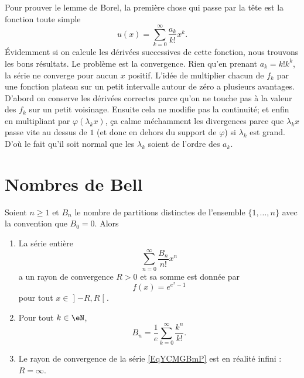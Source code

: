 \begin{remark}
	Pour prouver le lemme de Borel, la première chose qui passe par la tête est la fonction toute simple
	\begin{equation}
		u(x)=\sum_{k=0}^{\infty}\frac{ a_k }{ k! }x^k.
	\end{equation}
	Évidemment si on calcule les dérivées successives de cette fonction, nous trouvons les bons résultats. Le problème est la convergence.  Rien qu'en prenant \( a_k=k!k^k\), la série ne converge pour aucun \( x\) positif. L'idée de multiplier chacun de \( f_k\) par une fonction plateau sur un petit intervalle autour de zéro a plusieurs avantages. D'abord on conserve les dérivées correctes parce qu'on ne touche pas à la valeur des \( f_k\) sur un petit voisinage. Ensuite cela ne modifie pas la continuité; et enfin en multipliant par \( \varphi(\lambda_kx)\), ça calme méchamment les divergences parce que \( \lambda_kx\) passe vite au dessus de \( 1\) (et donc en dehors du support de \( \varphi\)) si \( \lambda_k\) est grand. D'où le fait qu'il soit normal que les \( \lambda_k\) soient de l'ordre des \( a_k\).
\end{remark}

\section{Nombres de Bell}

\begin{theorem}  \label{ThoYFAzwSg}
	Soient \( n\geq 1\) et \( B_n\) le nombre de partitions distinctes de l'ensemble \( \{ 1,\ldots, n \}\) avec la convention que \( B_0=0\). Alors
	\begin{enumerate}
		\item
		      La série entière
		      \begin{equation}    \label{EqYCMGBmP}
			      \sum_{n=0}^{\infty}\frac{ B_n }{ n! }x^n
		      \end{equation}
		      a un rayon de convergence \( R>0\) et sa somme est donnée par
		      \begin{equation}
			      f(x)= e^{ e^{x}-1}
		      \end{equation}
		      pour tout \( x\in\mathopen] -R , R \mathclose[\).
		\item
		      Pour tout \( k\in \eN\),
		      \begin{equation}
			      B_n=\frac{1}{ e }\sum_{k=0}^{\infty}\frac{ k^n }{ k! }.
		      \end{equation}
		\item
		      Le rayon de convergence de la série \eqref{EqYCMGBmP} est en réalité infini : \( R=\infty\).
	\end{enumerate}
\end{theorem}

